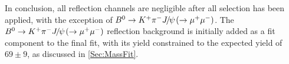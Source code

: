 In conclusion, all reflection channels are negligible after all selection has been applied, with the exception of $\Bd\to \Kp\pim\jpsi(\to\mumu)$. The $\Bd\to \Kp\pim\jpsi(\to\mumu)$ reflection background is initially added as a fit component to the final fit, with its yield constrained to the expected yield of $69\pm9$, as discussed in \autoref{Sec:MassFit}.%







